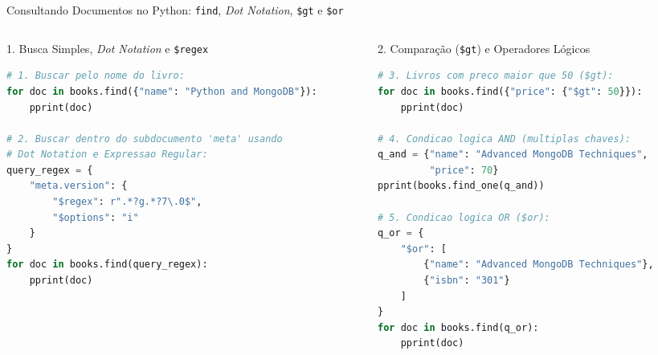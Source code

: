 \begin{frame}[fragile]{Consultando Documentos no Python: \texttt{find}, \textit{Dot Notation}, \texttt{\$gt} e \texttt{\$or}}
  \vspace{0.05cm}
  \begin{columns}[t]
    \begin{column}{0.48\textwidth}
      \alert{1. Busca Simples, \textit{Dot Notation} e \texttt{\$regex}}\par
      \begin{lstlisting}[language=Python]
# 1. Buscar pelo nome do livro:
for doc in books.find({"name": "Python and MongoDB"}):
    pprint(doc)

# 2. Buscar dentro do subdocumento 'meta' usando
# Dot Notation e Expressao Regular:
query_regex = {
    "meta.version": {
        "$regex": r".*?g.*?7\.0$",
        "$options": "i"
    }
}
for doc in books.find(query_regex):
    pprint(doc)
      \end{lstlisting}
    \end{column}
    \begin{column}{0.48\textwidth}
      \alert{2. Comparação (\texttt{\$gt}) e Operadores Lógicos}\par
      \begin{lstlisting}[language=Python]
# 3. Livros com preco maior que 50 ($gt):
for doc in books.find({"price": {"$gt": 50}}):
    pprint(doc)

# 4. Condicao logica AND (multiplas chaves):
q_and = {"name": "Advanced MongoDB Techniques",
         "price": 70}
pprint(books.find_one(q_and))

# 5. Condicao logica OR ($or):
q_or = {
    "$or": [
        {"name": "Advanced MongoDB Techniques"},
        {"isbn": "301"}
    ]
}
for doc in books.find(q_or):
    pprint(doc)
      \end{lstlisting}
    \end{column}
  \end{columns}
\end{frame}

